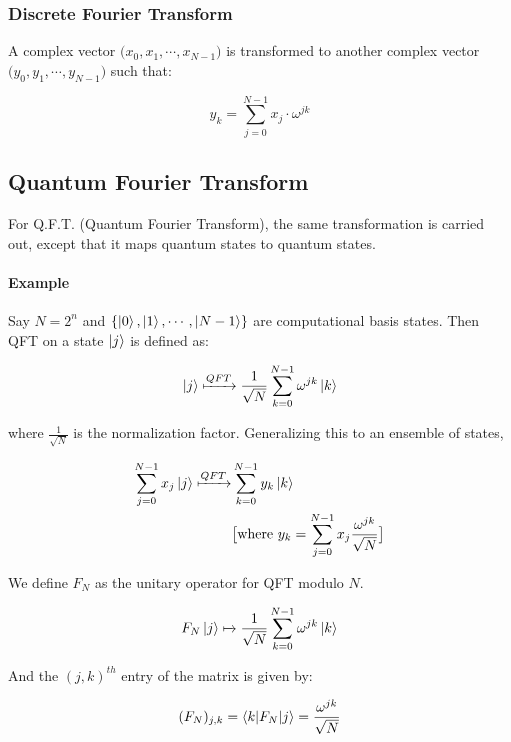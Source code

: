\documentclass[11.5pt, paper=a4]{article}
\theoremstyle{definition}
\numberwithin{theorem}{section}
\begin{document}
\subsubsection{Discrete Fourier Transform}

A complex vector $\big(x_0, x_1, \cdots, x_{N-1} \big)$ is transformed to another complex vector
$\big( y_0, y_1, \cdots, y_{N-1} \big)$ such that:

\begin{equation}
    y_k = \sum_{j=0}^{N-1} x_j \cdot \omega^{jk}
\end{equation}

\subsection{Quantum Fourier Transform}

For Q.F.T. (Quantum Fourier Transform), the same transformation is carried out, except that it maps
quantum states to quantum states.

\paragraph{Example}
Say $N = 2^n$ and $\{ \ket{0}, \ket{1}, \cdots, \ket{N-1} \}$ are computational basis states. Then
QFT on a state $\ket{j}$ is defined as:

\[
    \ket{j} \xmapsto{QFT} \displaystyle \frac{1}{\sqrt{N}} \sum_{k=0}^{N-1} \omega^{jk} \ket{k}
\]

where $\displaystyle \frac{1}{\sqrt{N}}$ is the normalization factor. Generalizing this to an ensemble of states,

\begin{align}
    \sum_{j=0}^{N-1} x_j\ket{j} \xmapsto{QFT} & \sum_{k=0}^{N-1} y_k \ket{k}                   \\
                                              & \big[ \text{where } y_k = \sum_{j=0}^{N-1} x_j
        \frac{\omega^{jk}}{\sqrt{N}} \big] \nonumber
\end{align}


We define $F_N$ as the unitary operator for QFT modulo $N$.

\[
    F_N\ket{j} \xmapsto{} \displaystyle \frac{1}{\sqrt{N}} \sum_{k=0}^{N-1} \omega^{jk} \ket{k}
\]

And the $(j, k)^{th}$ entry of the matrix is given by:

\[
    (F_N)_{j,k} = \braket{k|F_N|j} = \displaystyle \frac{\omega^{jk}}{\sqrt{N}}
\]
\end{document}
